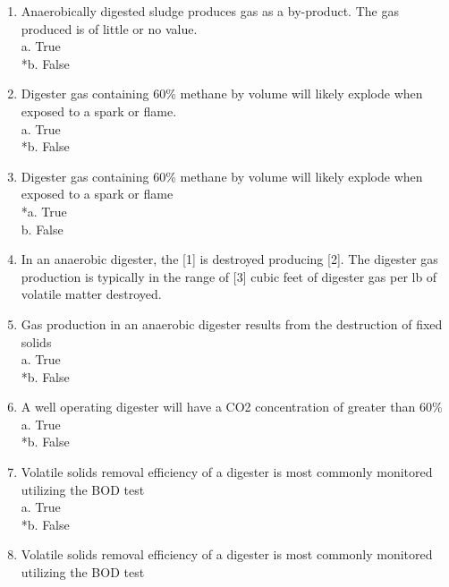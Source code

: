 \documentclass{article}
\begin{document}
\begin{enumerate}
\item  Anaerobically digested sludge produces gas as a by-product. The gas produced is of little or no value. \\

a. True \\
*b. False \\

\item  Digester gas containing 60\% methane by volume will likely explode when exposed to a spark or flame. \\

a. True \\
*b. False \\

\item  Digester gas containing 60\% methane by volume will likely explode when exposed to a spark or flame \\

*a. True \\
b. False \\

\item  In an anaerobic digester, the [1] is destroyed producing [2].  The digester gas production is typically in the range of [3] cubic feet of digester gas per lb of volatile matter destroyed. \\

\item  Gas production in an anaerobic digester results from the destruction of fixed solids \\

a. True \\
*b. False \\

\item  A well operating digester will have a CO2 concentration of greater than 60\% \\

a. True \\
*b. False \\

\item  Volatile solids removal efficiency of a digester is most commonly monitored utilizing the BOD test\\

a. True \\
*b. False \\

\item  Volatile solids removal efficiency of a digester is most commonly monitored utilizing the BOD test\\


\end{enumerate}
\end{document}
